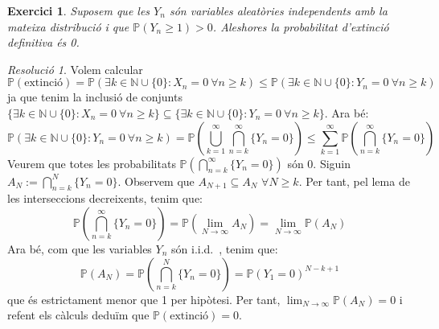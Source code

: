 \documentclass[10pt,a4paper]{article}
\newcommand{\NN}{\ensuremath{\mathbb{N}}} %
\newcommand{\Prob}{\ensuremath{\mathbb{P}}} %
\newcommand{\iid}{i.i.d.\ } %
\newtheorem{exercici}{Exercici}
\theoremstyle{definition}
\theoremstyle{remark}
\newtheorem{res}{Resolució}
\begin{document}
\begin{exercici}
  Suposem que les $Y_n$ són variables aleatòries independents amb la mateixa distribució i que $\Prob(Y_n\geq 1)>0$. Aleshores la probabilitat d'extinció definitiva és 0.
\end{exercici}
\begin{res}
  Volem calcular $$\Prob(\text{extinció})=\Prob\left(\exists k\in\NN\cup\{0\}:X_n=0\ \forall n\geq k\right)\leq\Prob\left(\exists k\in\NN\cup\{0\}:Y_n=0\ \forall n\geq k\right)$$
  ja que tenim la inclusió de conjunts $\{\exists k\in\NN\cup\{0\}:X_n=0\ \forall n\geq k\}\subseteq\{\exists k\in\NN\cup\{0\}:Y_n=0\ \forall n\geq k\}$. Ara bé:
  $$\Prob\left(\exists k\in\NN\cup\{0\}:Y_n=0\ \forall n\geq k\right)=\Prob\left(\bigcup_{k=1}^\infty\bigcap_{n=k}^\infty\{Y_n=0\}\right)\leq\sum_{k=1}^\infty\Prob\left(\bigcap_{n=k}^\infty \{Y_n=0\}\right)$$
  Veurem que totes les probabilitats $\Prob\left(\bigcap_{n=k}^\infty \{Y_n=0\}\right)$ són 0. Siguin $A_N:=\bigcap_{n=k}^N \{Y_n=0\}$. Observem que $A_{N+1}\subseteq A_{N}$ $\forall N\geq k$. Per tant, pel lema de les interseccions decreixents, tenim que:
  $$\Prob\left(\bigcap_{n=k}^\infty \{Y_n=0\}\right)=\Prob(\lim_{N\to\infty}A_N)=\lim_{N\to\infty}\Prob(A_N)$$
  Ara bé, com que les variables $Y_n$ són \iid, tenim que:
  $$\Prob(A_N)=\Prob\left(\bigcap_{n=k}^N \{Y_n=0\}\right)={\Prob(Y_1=0)}^{N-k+1}$$
  que és estrictament menor que 1 per hipòtesi. Per tant, $\displaystyle\lim_{N\to\infty}\Prob(A_N)=0$ i refent els càlculs deduïm que $\Prob(\text{extinció})=0$.
\end{res}
\end{document}
